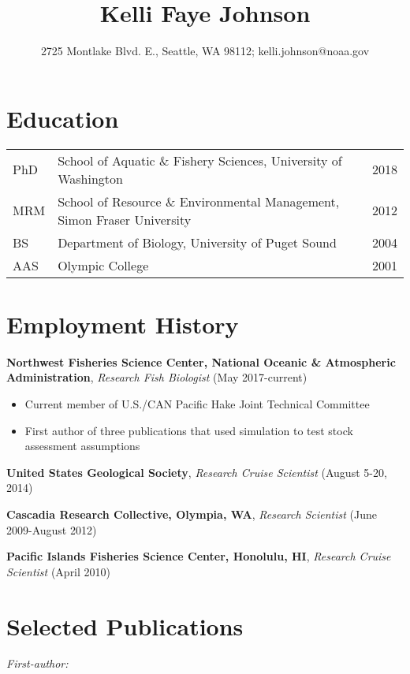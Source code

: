 \documentclass[10pt]{article}
\title{\bfseries\Large Kelli Faye Johnson}
\author{2725 Montlake Blvd. E., Seattle, WA 98112; kelli.johnson@noaa.gov}
\date{}
\begin{document}

\maketitle
\vspace{-15mm}
\noindent\makebox[\linewidth]{\rule{\paperwidth}{0.4pt}}
\section*{Education}
\begin{tabular}{lll}
PhD & School of Aquatic \& Fishery Sciences, University of Washington & 2018 \\
MRM & School of Resource \& Environmental Management, Simon Fraser University & 2012 \\
BS & Department of Biology, University of Puget Sound & 2004 \\
AAS & Olympic College & 2001 \\
\end{tabular}

\section*{Employment History}

\textbf{Northwest Fisheries Science Center, National Oceanic \& Atmospheric Administration}, \textit{Research Fish Biologist} (May 2017-current)
\begin{itemize}
\vspace{-2.5mm}
  \item Current member of U.S./CAN Pacific Hake Joint Technical Committee
  \item First author of three publications that used simulation to test stock assessment assumptions
\end{itemize}

\noindent \textbf{United States Geological Society}, \textit{Research Cruise Scientist} (August 5-20, 2014)

\noindent \textbf{Cascadia Research Collective, Olympia, WA}, \textit{Research Scientist} (June 2009-August 2012)

\noindent \textbf{Pacific Islands Fisheries Science Center, Honolulu, HI}, \textit{Research Cruise Scientist} (April 2010)

\section*{Selected Publications}
\noindent \textit{First-author:}
\end{document}
